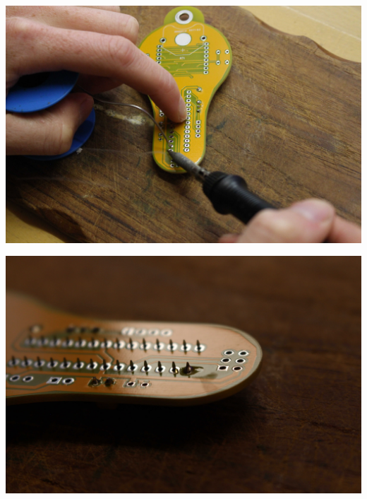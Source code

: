 \documentclass{article}
\begin{document}
\begin{minipage}[b]{0.5\textwidth}
	\includegraphics[width=\textwidth]{Bilder/IMG_5555.JPG}
	\label{fig:}
\end{minipage}
\begin{minipage}[b]{0.5\textwidth}
	\includegraphics[width=\textwidth]{Bilder/IMG_5558.JPG}
	\label{fig:}
\end{minipage}
\end{document}
